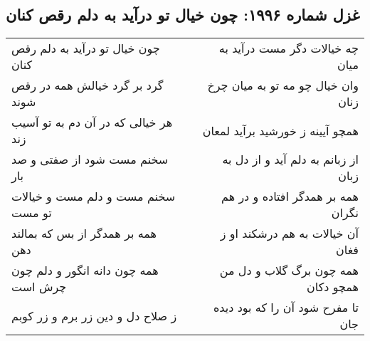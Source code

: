 \begin{center}
\section*{غزل شماره ۱۹۹۶: چون خیال تو درآید به دلم رقص کنان}
\label{sec:1996}
\begin{longtable}{l p{0.5cm} r}
چون خیال تو درآید به دلم رقص کنان
&&
چه خیالات دگر مست درآید به میان
\\
گرد بر گرد خیالش همه در رقص شوند
&&
وان خیال چو مه تو به میان چرخ زنان
\\
هر خیالی که در آن دم به تو آسیب زند
&&
همچو آیینه ز خورشید برآید لمعان
\\
سخنم مست شود از صفتی و صد بار
&&
از زبانم به دلم آید و از دل به زبان
\\
سخنم مست و دلم مست و خیالات تو مست
&&
همه بر همدگر افتاده و در هم نگران
\\
همه بر همدگر از بس که بمالند دهن
&&
آن خیالات به هم درشکند او ز فغان
\\
همه چون دانه انگور و دلم چون چرش است
&&
همه چون برگ گلاب و دل من همچو دکان
\\
ز صلاح دل و دین زر برم و زر کوبم
&&
تا مفرح شود آن را که بود دیده جان
\\
\end{longtable}
\end{center}
